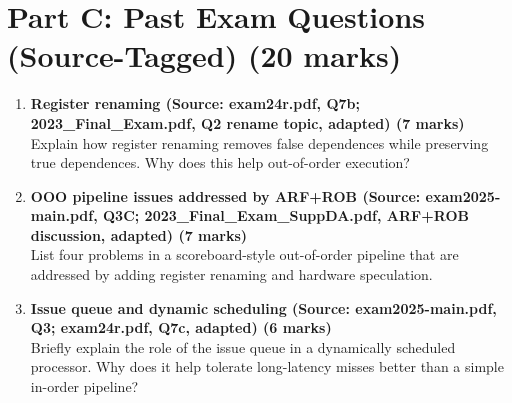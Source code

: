 \documentclass[11pt]{article}
\begin{document}
\section*{Part C: Past Exam Questions (Source-Tagged) (20 marks)}
\begin{enumerate}[label=\textbf{C\arabic*.}]
  \item \textbf{Register renaming (Source: exam24r.pdf, Q7b; 2023\_Final\_Exam.pdf, Q2 rename topic, adapted) (7 marks)}\\
  Explain how register renaming removes false dependences while preserving true dependences. Why does this help out-of-order execution?

  \item \textbf{OOO pipeline issues addressed by ARF+ROB (Source: exam2025-main.pdf, Q3C; 2023\_Final\_Exam\_SuppDA.pdf, ARF+ROB discussion, adapted) (7 marks)}\\
  List four problems in a scoreboard-style out-of-order pipeline that are addressed by adding register renaming and hardware speculation.

  \item \textbf{Issue queue and dynamic scheduling (Source: exam2025-main.pdf, Q3; exam24r.pdf, Q7c, adapted) (6 marks)}\\
  Briefly explain the role of the issue queue in a dynamically scheduled processor. Why does it help tolerate long-latency misses better than a simple in-order pipeline?
\end{enumerate}
\end{document}
